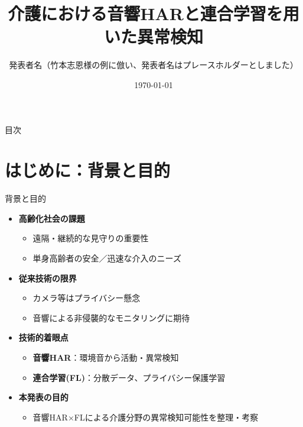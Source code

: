 \documentclass[unicode,12pt,aspectratio=169,dvipdfmx]{beamer}
\title{介護における音響HARと連合学習を用いた異常検知}
\author{発表者名（竹本志恩様の例に倣い、発表者名はプレースホルダーとしました）}
\date{\today}
\institute{所属機関名（INIAD様の例に倣い、所属機関名はプレースホルダーとしました）}
\begin{document}
\frame{\maketitle}
\begin{frame}{目次}
  \tableofcontents[hideallsubsections]
\end{frame}
\section{はじめに：背景と目的}
\begin{frame}{背景と目的}
  \begin{itemize}
    \item \textbf{高齢化社会の課題}
    \begin{itemize}
      \item 遠隔・継続的な見守りの重要性
      \item 単身高齢者の安全／迅速な介入のニーズ
    \end{itemize}
    \item \textbf{従来技術の限界}
    \begin{itemize}
      \item カメラ等はプライバシー懸念
      \item 音響による非侵襲的なモニタリングに期待
    \end{itemize}
    \item \textbf{技術的着眼点}
    \begin{itemize}
      \item \textbf{音響HAR}：環境音から活動・異常検知
      \item \textbf{連合学習(FL)}：分散データ、プライバシー保護学習
    \end{itemize}
    \item \textbf{本発表の目的}
    \begin{itemize}
      \item 音響HAR×FLによる介護分野の異常検知可能性を整理・考察
    \end{itemize}
  \end{itemize}
\end{frame}
\end{document}
